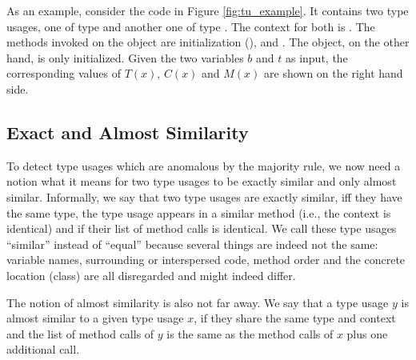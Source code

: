 As an example, consider the code in Figure \ref{fig:tu_example}.
It contains two type usages, one of type  and another one of type .
The context for both is .
The methods invoked on the  object are initialization (),  and .
The  object, on the other hand, is only initialized.
Given the two variables $b$ and $t$ as input, the corresponding values of $T(x)$, $C(x)$ and $M(x)$ are shown on the right hand side.

\subsection{Exact and Almost Similarity}

To detect type usages which are anomalous by the majority rule, we now need a notion what it means for two type usages to be exactly similar and only almost similar.
Informally, we say that two type usages are exactly similar, iff they have the same type, the type usage appears in a similar method (i.e., the context is identical) and if their list of method calls is identical.
We call these type usages ``similar'' instead of ``equal'' because several things are indeed not the same: variable names, surrounding or interspersed code, method order and the concrete location (class) are all disregarded and might indeed differ.

The notion of almost similarity is also not far away.
We say that a type usage $y$ is almost similar to a given type usage $x$, if they share the same type and context and the list of method calls of $y$ is the same as the method calls of $x$ plus one additional call.

